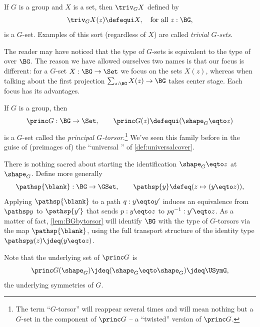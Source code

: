 \begin{example}\label{def:trivGset}
  If $G$ is a group and $X$ is a set, then $\triv_G X$ defined by
  \[\triv_G X(z)\defequi X, \quad\text{for all $z:\BG$,}\]
  is a $G$-set.
  Examples of this sort (regardless of $X$) are called \emph{trivial $G$-sets}.
\end{example}
\begin{remark}
  \label{rem:G-set-vs-set-bundle}
The reader may have noticed that the type of $G$-sets is equivalent to the
type of \coverings over $\BG$.
The reason we have allowed ourselves two names is that our focus is different: for a $G$-set $X:\BG\to\Set$ we focus on the sets $X(z)$, whereas when talking about \coverings the first projection $\sum_{z:\BG}X(z)\to \BG$ takes center stage.  Each focus has its advantages.
\end{remark}

\begin{example}\label{def:principaltorsor}
  If $G$ is a group, then
  \[
    \princ G:\BG\to\Set,
    \qquad\princ G(z)\defequi(\sh_G \eqto z)
  \]
  is a $G$-set called the \emph{principal $G$-torsor}.\footnote{%
    The term ``$G$-torsor'' will reappear several times and will mean nothing but a $G$-set in the component of $\princ G$ -- a ``twisted'' version of $\princ G$.}
  We've seen this family before in the guise of (preimages of) the
  ``universal \covering'' of \cref{def:universalcover}.

  There is nothing sacred about starting the identification
  $\sh_G \eqto z$ at $\sh_G$.
  Define more generally
  \begin{equation}\label{eq:pathsp}
    \pathsp{\blank}:\BG\to\GSet,
    \qquad
    \pathsp{y} \defeq (z \mapsto (y\eqto z)),
  \end{equation}
  Applying $\pathsp{\blank}$ to a path $q:y\eqto y'$
  induces an equivalence from $\pathsp y$ to $\pathsp {y'}$ that sends $p:y \eqto z$
  to $pq^{-1}:y'\eqto z$.
  As a matter of fact, \cref{lem:BGbytorsor} will identify $\BG$ with the type of
  $G$-torsors via the map $\pathsp{\blank}$,
  using the full transport structure of the identity 
  type $\pathsp y(z)\jdeq(y \eqto z)$.

  Note that the underlying set of $\princ G$ is
  \[
    \princ G(\sh_G) \jdeq
    (\sh_G \eqto \sh_G) \jdeq \USymG,
  \]
  the underlying symmetries of $G$. %
\end{example}


